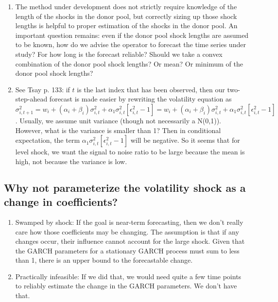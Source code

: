 \documentclass[11pt]{article}
\theoremstyle{definition}
\begin{document}
\begin{enumerate}
\item The method under development does not strictly require knowledge of the length of the shocks in the donor pool, but correctly sizing up those shock lengths is helpful to proper estimation of the shocks in the donor pool.  An important question remains: even if the donor pool shock lengths are assumed to be known, how do we advise the operator to forecast the time series under study?  For how long is the forecast reliable?  Should we take a convex combination of the donor pool shock lengths?  Or mean? Or minimum of the donor pool shock lengths?

\item See Tsay p. 133: if $t$ is the last index that has been observed, then our two-step-ahead forecast is made easier by rewriting the volatility equation as $\sigma^{2}_{i,t+1} = w_{i} + (\alpha_{i} + \beta_{i})\sigma^{2}_{i,t} + \alpha_{1}\sigma^{2}_{i,t}[\epsilon^{2}_{i,t} - 1]= w_{i} + (\alpha_{i} + \beta_{i})\sigma^{2}_{i,t} + \alpha_{1}\sigma^{2}_{i,t}[\epsilon^{2}_{i,t} - 1] $.  Usually, we assume unit variance (though not necessarily a N(0,1)).  However, what is the variance is smaller than 1?  Then in conditional expectation, the term $\alpha_{1}\sigma^{2}_{i,t}[\epsilon^{2}_{i,t} - 1]$ will be negative.  So it seems that for level shock, we want the signal to noise ratio to be large because the mean is high, not because the variance is low.
\end{enumerate}

\subsection{Why not parameterize the volatility shock as a change in coefficients?}
\begin{enumerate}
\item Swamped by shock: If the goal is near-term forecasting, then we don't really care how those coefficients may be changing.  The assumption is that if any changes occur, their influence cannot account for the large shock. Given that the GARCH parameters for a stationary GARCH process must sum to less than 1, there is an upper bound to the forecastable change.
\item Practically infeasible: If we did that, we would need quite a few time points to reliably estimate the change in the GARCH parameters.  We don't have that.
\end{enumerate}
\end{document}
